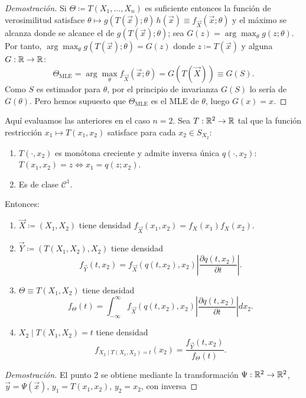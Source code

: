 \begin{proof}[Demostración]
Si $\Theta \coloneqq T(X_1, \dots, X_n)$ es suficiente entonces la función de verosimilitud satisface $\theta \mapsto g(T(\vec{x});\theta)\,h(\vec{x}) \equiv f_{\vec{X}}(\vec{x};\theta)$ y el máximo se alcanza donde se alcance el de $g(T(\vec{x});\theta)$; sea $G(z) = \arg\max_\theta g(z;\theta)$. Por tanto, $\arg\max_\theta g(T(\vec{x});\theta) = G(z)$ donde $z \coloneqq T(\vec{x})$ y alguna $G : \mathbb{R} \to \mathbb{R}$:
\[
  \Theta_{\text{MLE}} = \arg\max_\theta f_{\vec{X}}(\vec{x};\theta) = G(T(\vec{X})) \equiv G(S).
\]
Como $S$ es estimador para $\theta$, por el principio de invarianza $G(S)$ lo sería de $G(\theta)$. Pero hemos supuesto que $\Theta_{\text{MLE}}$ es el MLE de $\theta$, luego $G(x) = x$.
\end{proof}
\textcolor{azulresalt}{
\begin{proposicion}[9]
Aquí evaluamos las anteriores en el caso $n = 2$. Sea $T : \mathbb{R}^2 \to \mathbb{R}$ tal que la función restricción $x_1 \mapsto T(x_1, x_2)$ satisface para cada $x_2 \in S_{X_2}$:
\begin{enumerate}
  \item $T(\cdot, x_2)$ es monótona creciente y admite inversa única $q(\cdot, x_2)$: $T(x_1, x_2) = z \iff x_1 = q(z; x_2)$.
  \item Es de clase $\mathcal{C}^1$.
\end{enumerate}
Entonces:
\begin{enumerate}
  \item $\vec{X} \coloneqq (X_1, X_2)$ tiene densidad $f_{\vec{X}}(x_1, x_2) = f_X(x_1) f_X(x_2)$.
  \item $\vec{Y} \coloneqq (T(X_1, X_2), X_2)$ tiene densidad
  \[
    f_{\vec{Y}}(t, x_2) = f_{\vec{X}}(q(t, x_2), x_2)\left|\frac{\partial q(t, x_2)}{\partial t}\right|.
  \]
  \item $\Theta \equiv T(X_1, X_2)$ tiene densidad
  \[
    f_{\Theta}(t) = \int_{-\infty}^{\infty} f_{\vec{X}}(q(t, x_2), x_2)\left|\frac{\partial q(t, x_2)}{\partial t}\right| dx_2.
  \]
  \item $X_2 \mid T(X_1, X_2) = t$ tiene densidad
  \[
    f_{X_2 \mid T(X_1, X_2) = t}(x_2) = \frac{f_{\vec{Y}}(t, x_2)}{f_{\Theta}(t)}.
  \]
\end{enumerate}
\end{proposicion}
\begin{proof}[Demostración]
El punto 2 se obtiene mediante la transformación $\Psi : \mathbb{R}^2 \to \mathbb{R}^2$, $\vec{y} = \Psi(\vec{x})$, $y_1 = T(x_1, x_2)$, $y_2 = x_2$, con inversa 

\end{proof}}

